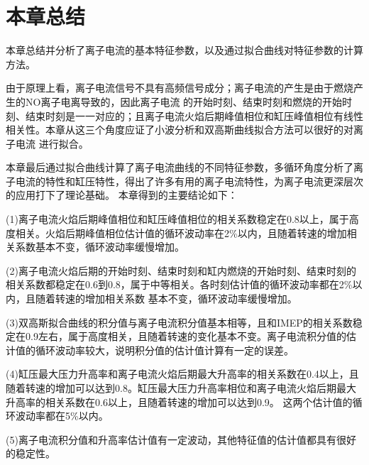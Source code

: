 \section{本章总结}
本章总结并分析了离子电流的基本特征参数，以及通过拟合曲线对特征参数的计算方法。\par
由于原理上看，离子电流信号不具有高频信号成分；离子电流的产生是由于燃烧产生的NO离子电离导致的，因此离子电流
的开始时刻、结束时刻和燃烧的开始时刻、结束时刻是一一对应的；且离子电流火焰后期峰值相位和缸压峰值相位有线性相关性。本章从这三个角度应证了小波分析和双高斯曲线拟合方法可以很好的对离子电流
进行拟合。\par
本章最后通过拟合曲线计算了离子电流曲线的不同特征参数，多循环角度分析了离子电流的特性和缸压特性，得出了许多有用的离子电流特性，为离子电流更深层次的应用打下了理论基础。
本章得到的主要结论如下：\par
(1)离子电流火焰后期峰值相位和缸压峰值相位的相关系数稳定在0.8以上，属于高度相关。火焰后期峰值相位估计值的循环波动率在2\%以内，且随着转速的增加相关系数基本不变，循环波动率缓慢增加。\par
(2)离子电流火焰后期的开始时刻、结束时刻和缸内燃烧的开始时刻、结束时刻的相关系数都稳定在0.6到0.8，属于中等相关。各时刻估计值的循环波动率都在2\%以内，且随着转速的增加相关系数
基本不变，循环波动率缓慢增加。\par
(3)双高斯拟合曲线的积分值与离子电流积分值基本相等，且和IMEP的相关系数稳定在0.9左右，属于高度相关，且随着转速的变化基本不变。离子电流积分值的估计值的循环波动率较大，说明积分值的估计值计算有一定的误差。\par
(4)缸压最大压力升高率和离子电流火焰后期最大升高率的相关系数在0.4以上，且随着转速的增加可以达到0.8。缸压最大压力升高率相位和离子电流火焰后期最大升高率的相关系数在0.6以上，且随着转速的增加可以达到0.9。
这两个估计值的循环波动率都在5\%以内。\par
(5)离子电流积分值和升高率估计值有一定波动，其他特征值的估计值都具有很好的稳定性。